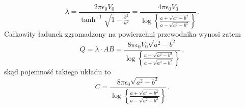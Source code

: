 \documentclass[../main.tex]{subfiles}
\begin{document}
\begin{enumerate}
\begin{equation*}
    \lambda=\frac{2\pi\epsilon_0V_0}{\tanh^{-1}\sqrt{1-\frac{b^2}{a^2}}}=\frac{4\pi\epsilon_0V_0}{\log\left\{\frac{a+\sqrt{a^2-b^2}}{a-\sqrt{a^2-b^2}}\right\}}\,.
\end{equation*}
Całkowity ładunek zgromadzony na powierzchni przewodnika wynosi zatem
\begin{equation*}
    Q=\lambda\cdot AB=\frac{8\pi\epsilon_0V_0\sqrt{a^2-b^2}}{\log\left\{\frac{a+\sqrt{a^2-b^2}}{a-\sqrt{a^2-b^2}}\right\}}\,,
\end{equation*}
skąd pojemność takiego układu to
\begin{equation*}
    C=\frac{8\pi\epsilon_0\sqrt{a^2-b^2}}{\log\left\{\frac{a+\sqrt{a^2-b^2}}{a-\sqrt{a^2-b^2}}\right\}}\,.
\end{equation*}


\end{enumerate}
\end{document}
